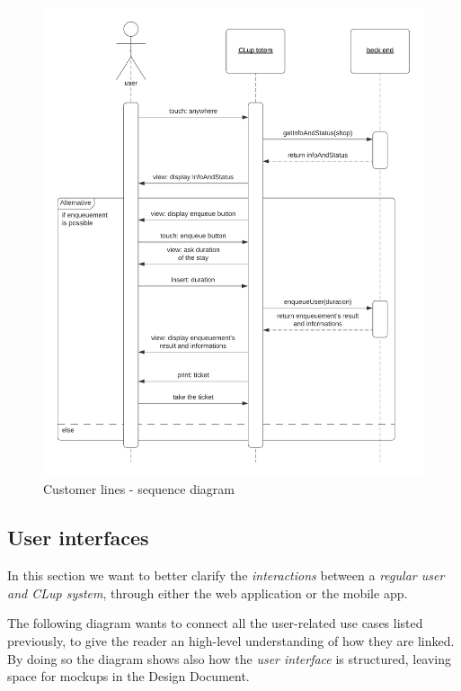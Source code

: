 \begin{figure}[h!]
    \centering
    \includegraphics[width=\textwidth]{Images/sequencediagrams/CustomerlinesupSD.png}
    \caption{\label{fig:customerlinesup}Customer lines - sequence diagram}
\end{figure}

\FloatBarrier

\subsection{User interfaces}
\label{subsect:userinterfaces}

In this section we want to better clarify the \textit{interactions} between a \textit{regular user and CLup system}, through either the web application or the mobile app. 

The following diagram wants to connect all the user-related use cases listed previously, to give the reader an high-level understanding of how they are linked. By doing so the diagram shows also how the \textit{user interface} is structured, leaving space for mockups in the Design Document.

